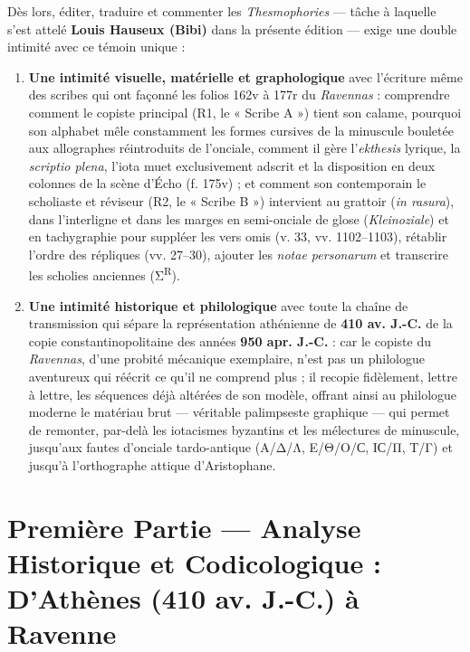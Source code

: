 \documentclass[11pt, a4paper, twoside]{article}
\renewcommand{\_}{\origunderscore\penalty0\relax}
\renewcommand{\texttt}[1]{#1}
\newcommand{\Run}{\textbf{R}\textsuperscript{1}}
\newcommand{\Rdeux}{\textbf{R}\textsuperscript{2}}
\newcommand{\Bibi}{\textit{Bibi}}
\def\Run{R1}%
\def\Rdeux{R2}%
\def\Bibi{Bibi}%
\begin{document}
Dès lors, éditer, traduire et commenter les \textit{Thesmophories} — tâche à laquelle s'est attelé \textbf{Louis Hauseux (\Bibi{})} dans la présente édition — exige une double intimité avec ce témoin unique :
\begin{enumerate}[leftmargin=1.6em, itemsep=2pt]
  \item \textbf{Une intimité visuelle, matérielle et graphologique} avec l'écriture même des scribes qui ont façonné les folios \texttt{162v} à \texttt{177r} du \textit{Ravennas} : comprendre comment le copiste principal (\Run{}, le « Scribe A ») tient son calame, pourquoi son alphabet mêle constamment les formes cursives de la minuscule bouletée aux allographes réintroduits de l'onciale, comment il gère l'\textit{ekthesis} lyrique, la \textit{scriptio plena}, l'iota muet exclusivement adscrit et la disposition en deux colonnes de la scène d'Écho (\texttt{f. 175v}) ; et comment son contemporain le scholiaste et réviseur (\Rdeux{}, le « Scribe B ») intervient au grattoir (\textit{in rasura}), dans l'interligne et dans les marges en semi-onciale de glose (\textit{Kleinoziale}) et en tachygraphie pour suppléer les vers omis (\texttt{v. 33}, \texttt{vv. 1102–1103}), rétablir l'ordre des répliques (\texttt{vv. 27–30}), ajouter les \textit{notae personarum} et transcrire les scholies anciennes (Σ\textsuperscript{R}).
  \item \textbf{Une intimité historique et philologique} avec toute la chaîne de transmission qui sépare la représentation athénienne de \textbf{410 av. J.-C.} de la copie constantinopolitaine des années \textbf{950 apr. J.-C.} : car le copiste du \textit{Ravennas}, d'une probité mécanique exemplaire, n'est pas un philologue aventureux qui réécrit ce qu'il ne comprend plus ; il recopie fidèlement, lettre à lettre, les séquences déjà altérées de son modèle, offrant ainsi au philologue moderne le matériau brut — véritable palimpseste graphique — qui permet de remonter, par-delà les iotacismes byzantins et les mélectures de minuscule, jusqu'aux fautes d'onciale tardo-antique (\texttt{Α/Δ/Λ}, \texttt{Ε/Θ/Ο/Ϲ}, \texttt{ΙϹ/Π}, \texttt{Τ/Γ}) et jusqu'à l'orthographe attique d'Aristophane.
\end{enumerate}



\section{Première Partie — Analyse Historique et Codicologique : D'Athènes (410 av. J.-C.) à Ravenne}
\end{document}
